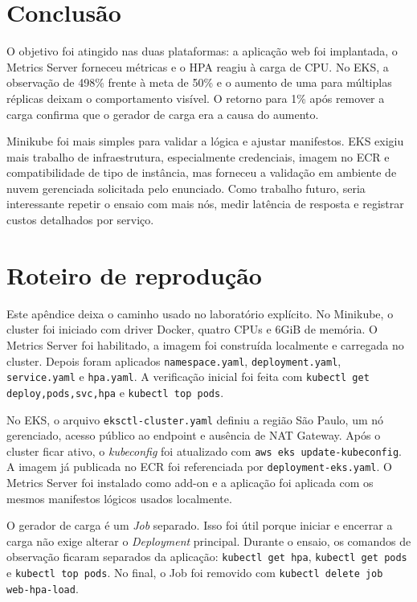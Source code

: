 \documentclass[conference]{IEEEtran}
\begin{document}
\section{Conclusão}
O objetivo foi atingido nas duas plataformas: a aplicação web foi implantada, o Metrics Server forneceu métricas e o HPA reagiu à carga de CPU. No EKS, a observação de 498\% frente à meta de 50\% e o aumento de uma para múltiplas réplicas deixam o comportamento visível. O retorno para 1\% após remover a carga confirma que o gerador de carga era a causa do aumento.

Minikube foi mais simples para validar a lógica e ajustar manifestos. EKS exigiu mais trabalho de infraestrutura, especialmente credenciais, imagem no ECR e compatibilidade de tipo de instância, mas forneceu a validação em ambiente de nuvem gerenciada solicitada pelo enunciado. Como trabalho futuro, seria interessante repetir o ensaio com mais nós, medir latência de resposta e registrar custos detalhados por serviço.

\appendices
\section{Roteiro de reprodução}
Este apêndice deixa o caminho usado no laboratório explícito. No Minikube, o cluster foi iniciado com driver Docker, quatro CPUs e 6GiB de memória. O Metrics Server foi habilitado, a imagem foi construída localmente e carregada no cluster. Depois foram aplicados \texttt{namespace.yaml}, \texttt{deployment.yaml}, \texttt{service.yaml} e \texttt{hpa.yaml}. A verificação inicial foi feita com \texttt{kubectl get deploy,pods,svc,hpa} e \texttt{kubectl top pods}.

No EKS, o arquivo \texttt{eksctl-cluster.yaml} definiu a região São Paulo, um nó gerenciado, acesso público ao endpoint e ausência de NAT Gateway. Após o cluster ficar ativo, o \textit{kubeconfig} foi atualizado com \texttt{aws eks update-kubeconfig}. A imagem já publicada no ECR foi referenciada por \texttt{deployment-eks.yaml}. O Metrics Server foi instalado como add-on e a aplicação foi aplicada com os mesmos manifestos lógicos usados localmente.

O gerador de carga é um \textit{Job} separado. Isso foi útil porque iniciar e encerrar a carga não exige alterar o \textit{Deployment} principal. Durante o ensaio, os comandos de observação ficaram separados da aplicação: \texttt{kubectl get hpa}, \texttt{kubectl get pods} e \texttt{kubectl top pods}. No final, o Job foi removido com \texttt{kubectl delete job web-hpa-load}.
\end{document}
